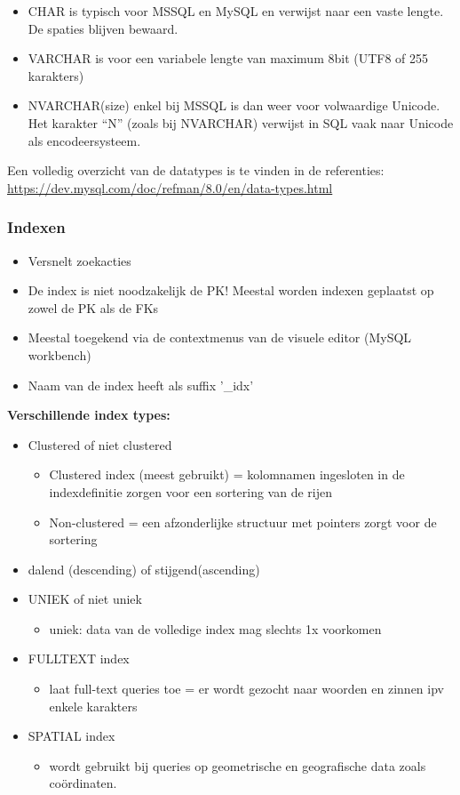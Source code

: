 \documentclass{article}
\newcommand{\bold}[1]{\textbf{#1}}
\begin{document}
\begin{itemize}
    \item CHAR is typisch voor MSSQL en MySQL en verwijst naar een vaste lengte. De spaties blijven bewaard.
    \item VARCHAR is voor een variabele lengte van maximum 8bit (UTF8 of 255 karakters)
    \item NVARCHAR(size) enkel bij MSSQL is dan weer voor volwaardige Unicode. Het karakter “N” (zoals bij NVARCHAR) verwijst in SQL vaak naar Unicode als encodeersysteem.
\end{itemize}

Een volledig overzicht van de datatypes is te vinden in de referenties: \url{https://dev.mysql.com/doc/refman/8.0/en/data-types.html}

\subsubsection{Indexen}
\begin{itemize}
    \item Versnelt zoekacties
    \item De index is niet noodzakelijk de PK! Meestal worden indexen geplaatst op zowel de PK als de FKs
    \item Meestal toegekend via de contextmenus van de visuele editor (MySQL workbench)
    \item Naam van de index heeft als suffix '\_idx'
\end{itemize}
\bold{Verschillende index types:}
\begin{itemize}
    \item Clustered of niet clustered
    \begin{itemize}
        \item Clustered index (meest gebruikt) = kolomnamen ingesloten in de indexdefinitie zorgen voor een sortering van de rijen
        \item Non-clustered = een afzonderlijke structuur met pointers zorgt voor de sortering 
    \end{itemize}
    \item dalend (descending) of stijgend(ascending)
    \item UNIEK of niet uniek
    \begin{itemize}
        \item uniek: data van de volledige index mag slechts 1x voorkomen
    \end{itemize}
    \item FULLTEXT index
    \begin{itemize}
        \item laat full-text queries toe = er wordt gezocht naar woorden en zinnen ipv enkele karakters
    \end{itemize}
    \item SPATIAL index
    \begin{itemize}
        \item wordt gebruikt bij queries op geometrische en geografische data zoals coördinaten.
    \end{itemize}
\end{itemize}
\end{document}
